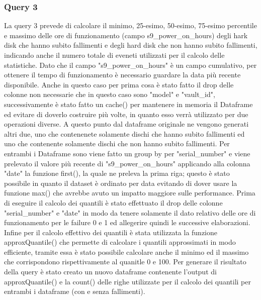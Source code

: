 \documentclass[conference]{IEEEtran}
\begin{document}
\subsubsection{Query 3}
La query 3 prevede di calcolare il minimo, 25-esimo, 50-esimo, 75-esimo percentile e massimo delle ore di funzionamento (campo s9\_power\_on\_hours) degli hark disk che hanno subito fallimenti e degli hard disk che non hanno subito fallimenti, indicando anche il numero totale di eveneti utilizzati per il calcolo delle statistiche.
Dato che il campo "s9\_power\_on\_hours" è un campo cumulativo, per ottenere il tempo di funzionamento è necessario guardare la data più recente disponibile.
Anche in questo caso per prima cosa è stato fatto il drop delle colonne non necessarie che in questo caso sono "model" e "vault\_id", successivamente è stato fatto un cache() per mantenere in memoria il Dataframe ed evitare di doverlo costruire più volte, in quanto esso verrà utilizzato per due operazioni diverse. A questo punto dal dataframe originale ne vengono generati altri due, uno che contenenete solamente dischi che hanno subito fallimenti ed uno che contenente solamente dischi che non hanno subito fallimenti. Per entrambi i Dataframe sono viene fatto un group by per "serial\_number" e viene prelevato il valore più recente di "s9\_power\_on\_hours" applicando alla colonna "date" la funzione first(), la quale ne preleva la prima riga; questo è stato possibile in quanto il dataset è ordinato per data evitando di dover usare la funzione max() che avrebbe avuto un impatto maggiore sulle performance. Prima di eseguire il calcolo dei quantili è stato effettuato il drop delle colonne "serial\_number" e "date" in modo da tenere solamente il dato relativo delle ore di funzionamento per le failure 0 e 1 ed allegerire quindi le successive elaborazioni. Infine per il calcolo effettivo dei quantili è stata utilizzata la funzione approxQuantile() che permette di calcolare i quantili approssimati in modo efficiente, tramite essa è stato possibile calcolare anche il minimo ed il massimo che corrispondono rispettivamente al quanitle 0 e 100. Per generare il risultato della query è stato creato un nuovo dataframe contenente l'output di approxQuantile() e la count() delle righe utilizzate per il calcolo dei quantili per entrambi i dataframe (con e senza fallimenti).
\end{document}
